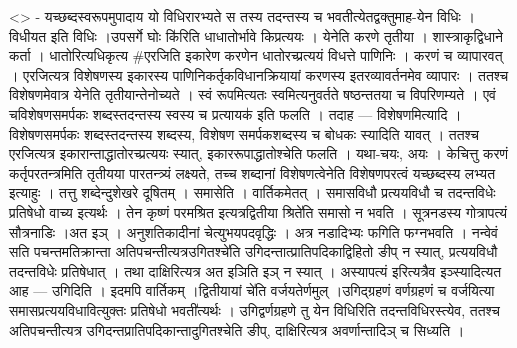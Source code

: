 \textless{}\textgreater{} - यच्छब्दस्वरूपमुपादाय यो विधिरारभ्यते स तस्य
तदन्तस्य च भवतीत्येतद्वक्तुमाह-येन विधिः । विधीयत इति विधिः ।उपसर्गे घोः
कि॑रिति धाधातोर्भावे किप्रत्ययः । येनेति करणे तृतीया ।
शास्त्राकृद्विधाने कर्ता । धातोरित्यधिकृत्य \#एरजिति इकारेण करणेन
धातोरच्प्रत्ययं विधत्ते पाणिनिः । करणं च व्यापारवत् । एरजित्यत्र
विशेषणस्य इकारस्य पाणिनिकर्तृकविधानक्रियायां करणस्य इतरव्यावर्तनमेव
व्यापारः । ततश्च विशेषणमेवात्र येनेति तृतीयान्तेनोच्यते । स्वं
रूपमित्यतः स्वमित्यनुवर्तते षष्ठन्ततया च विपरिणम्यते । एवं
चविशेषणसमर्पकः शब्दस्तदन्तस्य स्वस्य च प्रत्यायक॑ इति फलति । तदाह ---
विशेषणमित्यादि । विशेषणसमर्पकः शब्दस्तदन्तस्य शब्दस्य, विशेषण
समर्पकशब्दस्य च बोधकः स्यादिति यावत् । ततश्च एरजित्यत्र
इकारान्ताद्धातोरच्प्रत्ययः स्यात्, इकाररूपाद्धातोश्चेति फलति । यथा-चयः,
अयः । केचित्तु करणं कर्तृपरतन्त्रमिति तृतीयया पारतन्त्र्यं लक्ष्यते,
तच्च शब्दानां विशेषणत्वेनेति विशेषणपरत्वं यच्छब्दस्य लभ्यत इत्याहुः ।
तत्तु शब्देन्दुशेखरे दूषितम् । समासेति । वार्तिकमेतत् । समासविधौ
प्रत्ययविधौ च तदन्तविधेः प्रतिषेधो वाच्य इत्यर्थः । तेन कृष्णं परमश्रित
इत्यत्रद्वितीया श्रिते॑ति समासो न भवति । सूत्रनडस्य गोत्रापत्यं
सौत्रनाडिः ।अत इञ् । अनुशतिकादीनां चेत्युभयपदवृद्धिः । अत्र नडादिभ्यः
फगिति फग्नभवति । नन्वेवं सति पचन्तमतिक्रान्ता अतिपचन्तीत्यत्रउगितश्चे॑ति
उगिदन्तात्प्रातिपदिकाद्विहितो ङीप् न स्यात्, प्रत्ययविधौ तदन्तविधेः
प्रतिषेधात् । तथा दाक्षिरित्यत्र अत इञिति इञ् न स्यात् । अस्यापत्यं
इरित्यत्रैव इञ्स्यादित्यत आह --- उगिदिति । इदमपि वार्तिकम् ।द्वितीयायां
चे॑ति वर्जयतेर्णमुल् ।उगिद्ग्रहणं वर्णग्रहणं च वर्जयित्या
समासप्रत्ययविधावित्युक्तः प्रतिषेधो भवती॑त्यर्थः । उगिद्वर्णग्रहणे तु
येन विधिरिति तदन्तविधिरस्त्येव, ततश्च अतिपचन्तीत्यत्र
उगिदन्तप्रातिपदिकान्तादुगितश्चेति ङीप्, दाक्षिरित्यत्र अवर्णान्तादिञ् च
सिध्यति ।
